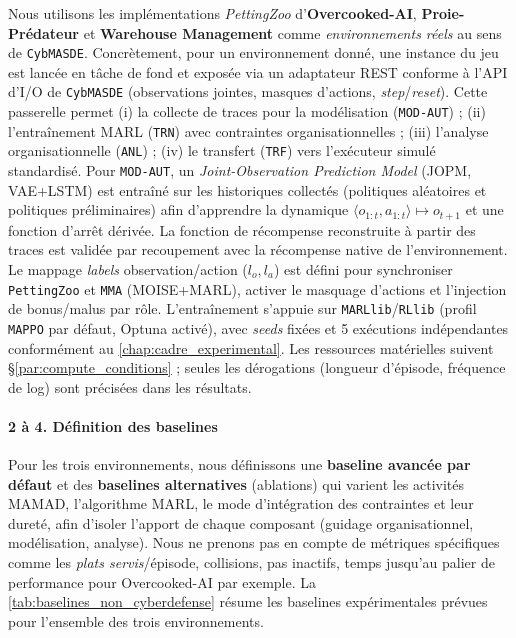Nous utilisons les implémentations \emph{PettingZoo} d’\textbf{Overcooked-AI}, \textbf{Proie-Prédateur} et \textbf{Warehouse Management} comme \emph{environnements réels} au sens de \texttt{CybMASDE}. Concrètement, pour un environnement donné, une instance du jeu est lancée en tâche de fond et exposée via un adaptateur REST conforme à l’API d’I/O de \texttt{CybMASDE} (observations jointes, masques d’actions, \emph{step}/\emph{reset}). Cette passerelle permet (i) la collecte de traces pour la modélisation (\texttt{MOD-AUT}) ; (ii) l’entraînement MARL (\texttt{TRN}) avec contraintes organisationnelles ; (iii) l’analyse organisationnelle (\texttt{ANL}) ; (iv) le transfert (\texttt{TRF}) vers l’exécuteur simulé standardisé.
Pour \texttt{MOD-AUT}, un \emph{Joint-Observation Prediction Model} (JOPM, VAE+LSTM) est entraîné sur les historiques collectés (politiques aléatoires et politiques préliminaires) afin d’apprendre la dynamique $\langle o_{1:t},a_{1:t} \rangle \mapsto o_{t+1}$ et une fonction d’arrêt dérivée. La fonction de récompense reconstruite à partir des traces est validée par recoupement avec la récompense native de l'environnement. Le mappage \emph{labels} observation/action ($l_o, l_a$) est défini pour synchroniser \texttt{PettingZoo} et \texttt{MMA} (MOISE+MARL), activer le masquage d’actions et l’injection de bonus/malus par rôle. L’entraînement s’appuie sur \texttt{MARLlib}/\texttt{RLlib} (profil \texttt{MAPPO} par défaut, Optuna activé), avec \textit{seeds} fixées et 5 exécutions indépendantes conformément au \autoref{chap:cadre_experimental}. Les ressources matérielles suivent \S\ref{par:compute_conditions} ; seules les dérogations (longueur d’épisode, fréquence de log) sont précisées dans les résultats.

\paragraph{2 à 4. Définition des baselines}

Pour les trois environnements, nous définissons une \textbf{baseline avancée par défaut} et des \textbf{baselines alternatives} (ablations) qui varient les activités MAMAD, l’algorithme MARL, le mode d’intégration des contraintes et leur dureté, afin d’isoler l’apport de chaque composant (guidage organisationnel, modélisation, analyse). Nous ne prenons pas en compte de métriques spécifiques comme les \emph{plats servis}/épisode, collisions, pas inactifs, temps jusqu’au palier de performance pour Overcooked-AI par exemple. La \autoref{tab:baselines_non_cyberdefense} résume les baselines expérimentales prévues pour l'ensemble des trois environnements.

